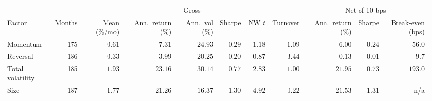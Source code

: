 \begin{tabular}{lrrrrrrrrrr}
\toprule
& & \multicolumn{6}{c}{Gross} & \multicolumn{3}{c}{Net of 10 bps} \\
\cmidrule(lr){3-8} \cmidrule(lr){9-11}
Factor & Months & Mean (\%/mo) & Ann.\ return (\%) & Ann.\ vol (\%) & Sharpe & NW $t$ & Turnover & Ann.\ return (\%) & Sharpe & Break-even (bps) \\
\midrule
Momentum & 175 & $0.61$ & $7.31$ & $24.93$ & $0.29$ & $1.18$ & $1.09$ & $6.00$ & $0.24$ & $56.0$ \\
Reversal & 186 & $0.33$ & $3.99$ & $20.25$ & $0.20$ & $0.87$ & $3.44$ & $-0.13$ & $-0.01$ & $9.7$ \\
Total volatility & 185 & $1.93$ & $23.16$ & $30.14$ & $0.77$ & $2.83$ & $1.00$ & $21.95$ & $0.73$ & $193.0$ \\
Size & 187 & $-1.77$ & $-21.26$ & $16.37$ & $-1.30$ & $-4.92$ & $0.22$ & $-21.53$ & $-1.31$ & n/a \\
\bottomrule
\end{tabular}
